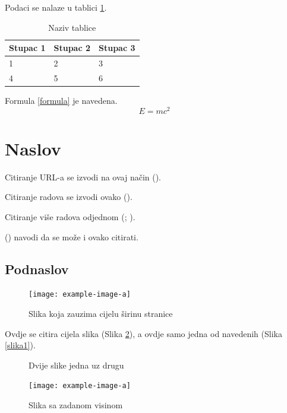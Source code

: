 \documentclass[12pt, oneside, a4paper, hidelinks]{report}
\begin{document}
	Podaci se nalaze u tablici \ref{tab:tablica}.
	\begin{table}[h]
		\centering
		\caption{Naziv tablice}
		\label{tab:tablica}
		\begin{tabularx}{\textwidth}{XXX}
			\toprule
			Stupac 1 & Stupac 2 & Stupac 3 \\ \midrule
			1 & 2 & 3 \\
			4 & 5 & 6 \\ \bottomrule
		\end{tabularx}
	\end{table}
	
	Formula \ref{formula} je navedena.
	\begin{equation}
		E=mc^2
		\label{formula}
	\end{equation}
	
	\section{Naslov}
	Citiranje URL-a se izvodi na ovaj način (\cite{slika}).
	
	Citiranje radova se izvodi ovako (\cite{knjiga}).
	
	Citiranje više radova odjednom (\cite{diplomski}; \cite{zbornik}).
	
	\citeauthor{clanak} (\citeyear{clanak}) navodi da se može i ovako citirati.
	
	\subsection{Podnaslov}
	\begin{figure}[h!]
		\centering
		\texttt{[image: example-image-a]}
		\caption{Slika koja zauzima cijelu širinu stranice}
		\label{slika_sirina}
	\end{figure}
	
	Ovdje se citira cijela slika (Slika \ref{slika_dvije}), a ovdje samo jedna od navedenih (Slika \ref{slika1}).
	\begin{figure}[h!]
		\centering
		\hspace*{\fill}
		\caption{Dvije slike jedna uz drugu}
		\label{slika_dvije}
	\end{figure}
		
	\begin{figure}[h!]
		\centering
		\texttt{[image: example-image-a]}
		\caption{Slika sa zadanom visinom}
		\label{slika_visina}
	\end{figure}
	
\end{document}
